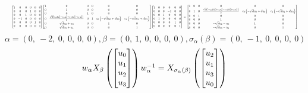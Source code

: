 \documentclass[11pt]{article}
\theoremstyle{definition}
\begin{document}
\[
\scaletoalign{\textwidth}{{\left[\begin{matrix}1 & 0 & 0 & 0 & 0 & 0\\0 & 0 & 0 & 1 & 0 & 0\\0 & 0 & 1 & 0 & 0 & 0\\0 & -1 & 0 & 0 & 0 & 0\\0 & 0 & 0 & 0 & 1 & 0\\0 & 0 & 0 & 0 & 0 & 1\end{matrix}\right]} {\left[\begin{matrix}1 & 0 & 0 & 0 & 0 & 0\\0 & 1 & 0 & 0 & 0 & 0\\0 & 0 & 1 & 0 & 0 & 0\\0 & \frac{\sqrt{d} \left(c_{0} d u_{2}^{2} - c_{0} u_{0}^{2} + c_{1} d u_{3}^{2} - c_{1} u_{1}^{2}\right)}{2} & 0 & 1 & c_{0} \left(- \sqrt{d} u_{0} + d u_{2}\right) & c_{1} \left(- \sqrt{d} u_{1} + d u_{3}\right)\\0 & \sqrt{d} u_{2} + u_{0} & 0 & 0 & 1 & 0\\0 & \sqrt{d} u_{3} + u_{1} & 0 & 0 & 0 & 1\end{matrix}\right]} {\left[\begin{matrix}1 & 0 & 0 & 0 & 0 & 0\\0 & 0 & 0 & -1 & 0 & 0\\0 & 0 & 1 & 0 & 0 & 0\\0 & 1 & 0 & 0 & 0 & 0\\0 & 0 & 0 & 0 & 1 & 0\\0 & 0 & 0 & 0 & 0 & 1\end{matrix}\right]} = {\left[\begin{matrix}1 & 0 & 0 & 0 & 0 & 0\\0 & 1 & 0 & \frac{\sqrt{d} \left(- c_{0} d u_{2}^{2} + c_{0} u_{0}^{2} - c_{1} d u_{3}^{2} + c_{1} u_{1}^{2}\right)}{2} & c_{0} \left(- \sqrt{d} u_{0} + d u_{2}\right) & c_{1} \left(- \sqrt{d} u_{1} + d u_{3}\right)\\0 & 0 & 1 & 0 & 0 & 0\\0 & 0 & 0 & 1 & 0 & 0\\0 & 0 & 0 & - \sqrt{d} u_{2} - u_{0} & 1 & 0\\0 & 0 & 0 & - \sqrt{d} u_{3} - u_{1} & 0 & 1\end{matrix}\right]}}
\]
\[
\alpha = \left( 0, \  -2, \  0, \  0, \  0, \  0\right), \beta = \left( 0, \  1, \  0, \  0, \  0, \  0\right), \sigma_{\alpha}(\beta) = \left( 0, \  -1, \  0, \  0, \  0, \  0\right)
\]
\[
\scaletoalign{\textwidth}{w_{\alpha} X_{\beta}\left(\left[\begin{matrix}u_{0}\\u_{1}\\u_{2}\\u_{3}\end{matrix}\right]\right) w_{\alpha}^{-1} = X_{\sigma_{\alpha}\left(\beta\right)}\left(\left[\begin{matrix}u_{2}\\u_{1}\\u_{3}\\u_{0}\end{matrix}\right]\right)}
\]
\end{document}
